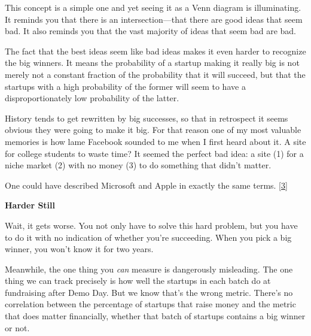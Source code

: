 This
                    concept is a simple one and yet seeing it as a Venn diagram
                    is illuminating. It reminds you that there is an
                    intersection---that there are good ideas that seem bad.
                    It also reminds you that the vast majority of ideas that
                    seem bad are bad.

The fact that the best ideas
                    seem like bad ideas makes it even harder to recognize the
                    big winners. It means the probability of a startup making it
                    really big is not merely not a constant fraction of the
                    probability that it will succeed, but that the startups with
                    a high probability of the former will seem to have a
                    disproportionately low probability of the latter.

History
                    tends to get rewritten by big successes, so that in
                    retrospect it seems obvious they were going to make it big.
                    For that reason one of my most valuable memories is how lame
                    Facebook sounded to me when I first heard about it. A site
                    for college students to waste time? It seemed the perfect
                    bad idea: a site (1) for a niche market (2) with no money
                    (3) to do something that didn't matter.

One could
                    have described Microsoft and Apple in exactly the same
                    terms.
                    [\href{\#f3n}{3}]

\textbf{Harder Still}

Wait, it gets
                    worse. You not only have to solve this hard problem, but you
                    have to do it with no indication of whether you're
                    succeeding. When you pick a big winner, you won't know it
                    for two years.

Meanwhile, the one thing you
                    \emph{can} measure is dangerously misleading. The one thing
                    we can track precisely is how well the startups in each
                    batch do at fundraising after Demo Day. But we know that's
                    the wrong metric. There's no correlation between the
                    percentage of startups that raise money and the metric that
                    does matter financially, whether that batch of startups
                    contains a big winner or not.

